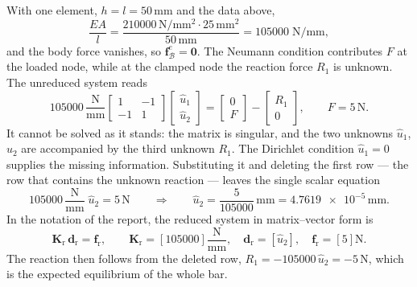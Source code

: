 \documentclass[11pt,a4paper]{article}
\numberwithin{equation}{section}
\theoremstyle{remark}
\newcommand{\bK}{\bm{K}}
\newcommand{\bd}{\bm{d}}
\newcommand{\bff}{\bm{f}}
\begin{document}
With one element, $h = l = 50\,\mathrm{mm}$ and the data above,
\begin{equation}\label{eq:numbers}
  \frac{EA}{l} = \frac{\num{210000}\,\mathrm{N/mm^2}\cdot 25\,\mathrm{mm^2}}{50\,\mathrm{mm}}
  = \num{105000}\;\mathrm{N/mm},
\end{equation}
and the body force vanishes, so $\bff_{\mathcal{B}}^e = \bm{0}$. The Neumann condition
contributes $F$ at the loaded node, while at the clamped node the reaction force $R_1$ is
unknown. The unreduced system reads
\begin{equation}\label{eq:unreduced}
  \num{105000}\,\frac{\mathrm{N}}{\mathrm{mm}}
  \begin{bmatrix} 1 & -1 \\ -1 & 1 \end{bmatrix}
  \begin{bmatrix} \hat{u}_1 \\ \hat{u}_2 \end{bmatrix}
  = \begin{bmatrix} 0 \\ F \end{bmatrix}
  - \begin{bmatrix} R_1 \\ 0 \end{bmatrix},
  \qquad F = 5\,\mathrm{N}.
\end{equation}
It cannot be solved as it stands: the matrix is singular, and the two unknowns $\hat u_1$,
$\hat u_2$ are accompanied by the third unknown $R_1$. The Dirichlet condition
$\hat{u}_1 = 0$ supplies the missing information. Substituting it and deleting the first
row --- the row that contains the unknown reaction --- leaves the single scalar equation
\begin{equation}\label{eq:reduced1}
  \num{105000}\,\frac{\mathrm{N}}{\mathrm{mm}}\;\hat{u}_2 = 5\,\mathrm{N}
  \qquad\Longrightarrow\qquad
  \hat{u}_2 = \frac{5}{\num{105000}}\,\mathrm{mm}
            = \num{4.7619e-5}\,\mathrm{mm} .
\end{equation}
In the notation of the report, the reduced system in matrix--vector form is
\begin{equation}\label{eq:reducedmatrix}
  \boxed{\;
  \bK_{\mathrm{r}}\,\bd_{\mathrm{r}} = \bff_{\mathrm{r}},
  \qquad
  \bK_{\mathrm{r}} = \left[\num{105000}\right]\frac{\mathrm{N}}{\mathrm{mm}},
  \quad
  \bd_{\mathrm{r}} = \left[\hat{u}_2\right],
  \quad
  \bff_{\mathrm{r}} = \left[5\right]\mathrm{N}. \;}
\end{equation}
The reaction then follows from the deleted row,
$R_1 = -\num{105000}\,\hat u_2 = -5\,\mathrm{N}$, which is the expected equilibrium of the
whole bar.
\end{document}
